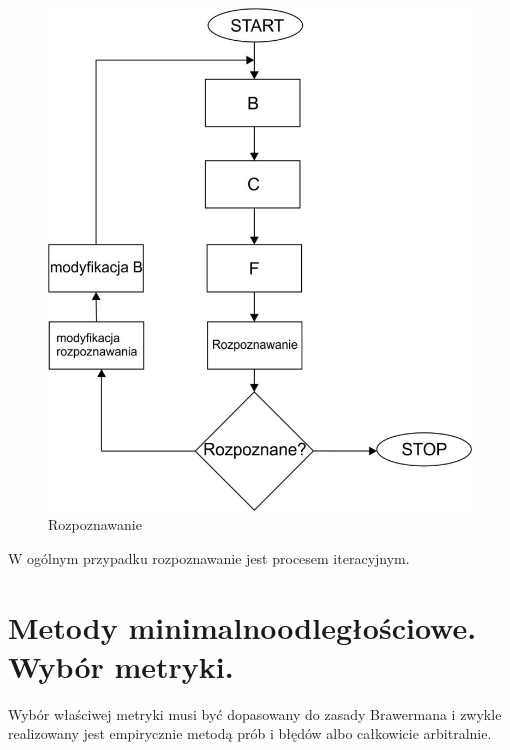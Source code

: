 \documentclass[a4paper,10pt]{article}
\begin{document}
\begin{figure}[ht]
  \centering
  \includegraphics{rozpoznawanie.png}
  \caption{Rozpoznawanie}
  \label{fig:recognition}
\end{figure}

W ogólnym przypadku rozpoznawanie jest procesem iteracyjnym.

\section{Metody minimalnoodległościowe. Wybór metryki.}
Wybór właściwej metryki musi być dopasowany do zasady Brawermana i zwykle realizowany jest empirycznie metodą prób i błędów albo całkowicie arbitralnie.
\end{document}
